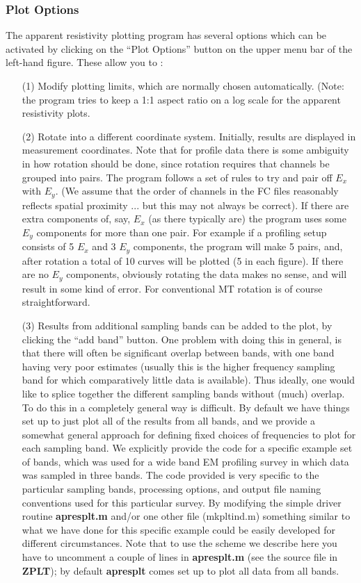 \subsubsection{Plot Options}
The apparent resistivity plotting program has several options
which can be activated by clicking on the ``Plot Options'' button
on the upper menu bar of the left-hand figure.  These allow
you to :
\begin{itemize}

\item[(1)]
Modify plotting limits, which are normally chosen automatically.
(Note: the program tries to keep a 1:1 aspect ratio on a log scale
for the apparent resistivity plots.

\item[(2)]
Rotate into a different coordinate system.  Initially, results are
displayed in measurement coordinates.  Note that for profile data
there is some ambiguity in how rotation should be done, since 
rotation requires that channels be grouped into pairs.  The
program follows a set of rules to try and pair off $E_x$ with $E_y$.
(We assume that the order of channels in the FC files reasonably
reflects spatial proximity ... but this may not always be correct).
If there are extra components of, say, $E_x$ (as there typically are)
the program uses some $E_y$ components for more than one pair.
For example if a profiling setup consists of 5 $E_x$  and 3 $E_y$
components, the program will make 5 pairs, and, after rotation
a total of 10 curves will be plotted (5 in each figure).
If there are no $E_y$ components, obviously rotating the data
makes no sense, and will result in some kind of error.
For conventional MT rotation is of course straightforward.

\item[(3)] 
Results from additional sampling bands can be added to the plot,
by clicking the ``add band'' button.
One problem with doing this in general, is that there will often
be significant overlap between bands, with one band 
having very poor estimates (usually this is the
higher frequency sampling band for which comparatively little data
is available).  Thus ideally, one would like to splice together
the different sampling bands without (much) overlap.
To do this in a completely general way is difficult.  By default
we have things set up to just plot all of the results from all bands,
and we provide a somewhat general approach for defining fixed 
choices of frequencies to plot for each sampling band.  We explicitly provide
the code for a specific example set of bands, which was used for
a wide band EM profiling survey in which data was sampled in
three bands.  The code provided is very specific to the
particular sampling bands, processing options, and output file
naming conventions used for this particular survey.
By modifying the simple driver routine {\bf apresplt.m} and/or
one other file ({mkpltind.m}) something similar to
what we have done for this specific example could be easily developed for
different circumstances.  Note that to use the scheme we describe
here you have to uncomment a couple of lines in
{\bf apresplt.m} (see the source file in {\bf ZPLT});
by default {\bf apresplt} comes set up to plot all data from all bands.


\end{itemize}
